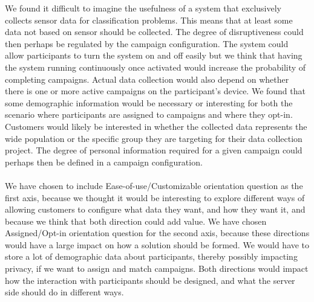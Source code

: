 We found it difficult to imagine the usefulness of a system that exclusively collects sensor data for classification problems. This means that at least some data not based on sensor should be collected. The degree of disruptiveness could then perhaps be regulated by the campaign configuration. 
The system could allow participants to turn the system on and off easily but we think that having the system running continuously once activated would increase the probability of completing campaigns. Actual data collection would also depend on whether there is one or more active campaigns on the participant's device. 
We found that some demographic information would be necessary or interesting for both the scenario where participants are assigned to campaigns and where they opt-in. Customers would likely be interested in whether the collected data represents the wide population or the specific group they are targeting for their data collection project. The degree of personal information required for a given campaign could perhaps then be defined in a campaign configuration. 
\\\\
We have chosen to include Ease-of-use/Customizable orientation question as the first axis, because we thought it would be interesting to explore different ways of allowing customers to configure what data they want, and how they want it, and because we think that both direction could add value. 
We have chosen Assigned/Opt-in orientation question for the second axis, because these directions would have a large impact on how a solution should be formed. We would have to store a lot of demographic data about participants, thereby possibly impacting privacy, if we want to assign and match campaigns. Both directions would impact how the interaction with participants should be designed, and what the server side should do in different ways.

